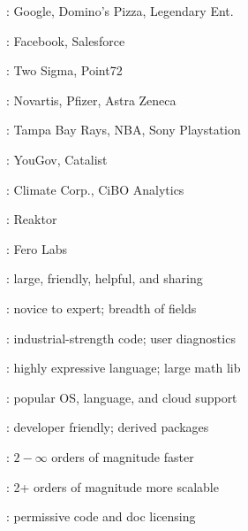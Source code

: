 \documentclass[10pt]{report}
\begin{document}
\vspace*{3pt}
\begin{subitemize}
\item {}: Google, Domino's Pizza, Legendary Ent.
\item {}: Facebook, Salesforce
\item {}: Two Sigma, Point72
\item {}: Novartis, Pfizer, Astra Zeneca
\item {}: Tampa Bay Rays, NBA, Sony Playstation
\item {}: YouGov, Catalist
\item {}: Climate Corp., CiBO Analytics
\item {}: Reaktor
\item {}: Fero Labs
\end{subitemize}


\vspace*{3pt}
\begin{subitemize}
\item {}: large, friendly, helpful, and sharing
\item {}:  novice to expert; breadth of fields
\item {}:  industrial-strength code; user diagnostics
\item {}:  highly expressive language;  large math lib
\item {}: popular OS, language, and cloud support
\item {}: developer friendly; derived packages
\item {}:  $2-\infty$ orders of magnitude faster
\item {}:  2+ orders of magnitude more scalable
\item {}: permissive code and doc licensing
\end{subitemize}


\end{document}

